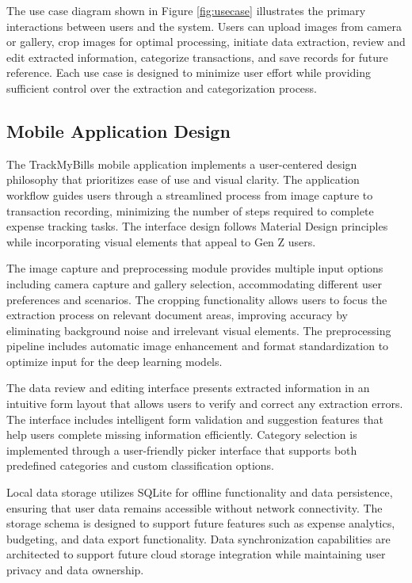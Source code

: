 The use case diagram shown in Figure \ref{fig:usecase} illustrates the primary interactions between users and the system. Users can upload images from camera or gallery, crop images for optimal processing, initiate data extraction, review and edit extracted information, categorize transactions, and save records for future reference. Each use case is designed to minimize user effort while providing sufficient control over the extraction and categorization process.

\subsection{Mobile Application Design}
The TrackMyBills mobile application implements a user-centered design philosophy that prioritizes ease of use and visual clarity. The application workflow guides users through a streamlined process from image capture to transaction recording, minimizing the number of steps required to complete expense tracking tasks. The interface design follows Material Design principles while incorporating visual elements that appeal to Gen Z users.

The image capture and preprocessing module provides multiple input options including camera capture and gallery selection, accommodating different user preferences and scenarios. The cropping functionality allows users to focus the extraction process on relevant document areas, improving accuracy by eliminating background noise and irrelevant visual elements. The preprocessing pipeline includes automatic image enhancement and format standardization to optimize input for the deep learning models.

The data review and editing interface presents extracted information in an intuitive form layout that allows users to verify and correct any extraction errors. The interface includes intelligent form validation and suggestion features that help users complete missing information efficiently. Category selection is implemented through a user-friendly picker interface that supports both predefined categories and custom classification options.

Local data storage utilizes SQLite for offline functionality and data persistence, ensuring that user data remains accessible without network connectivity. The storage schema is designed to support future features such as expense analytics, budgeting, and data export functionality. Data synchronization capabilities are architected to support future cloud storage integration while maintaining user privacy and data ownership.

